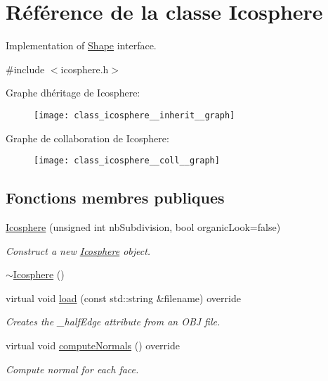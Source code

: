 \hypertarget{class_icosphere}{}\section{Référence de la classe Icosphere}
\label{class_icosphere}


Implementation of \hyperlink{class_shape}{Shape} interface.  




{\ttfamily \#include $<$icosphere.\+h$>$}



Graphe d\textquotesingle{}héritage de Icosphere\+:
\nopagebreak
\begin{figure}[H]
\begin{center}
\leavevmode
\texttt{[image: class\_icosphere\_\_inherit\_\_graph]}
\end{center}
\end{figure}


Graphe de collaboration de Icosphere\+:
\nopagebreak
\begin{figure}[H]
\begin{center}
\leavevmode
\texttt{[image: class\_icosphere\_\_coll\_\_graph]}
\end{center}
\end{figure}
\subsection*{Fonctions membres publiques}
\begin{DoxyCompactItemize}
\item 
\hyperlink{class_icosphere_a6051bb79f73f5aecb95074118fb019b3}{Icosphere} (unsigned int nb\+Subdivision, bool organic\+Look=false)
\begin{DoxyCompactList}\small\item\em Construct a new \hyperlink{class_icosphere}{Icosphere} object. \end{DoxyCompactList}\item 
\hyperlink{class_icosphere_ac9473c8c8d6085b6370d95772b898a45}{$\sim$\+Icosphere} ()
\item 
virtual void \hyperlink{class_icosphere_a72c3cc3d95cf508a623fe336cbbab350}{load} (const std\+::string \&filename) override
\begin{DoxyCompactList}\small\item\em Creates the \+\_\+half\+Edge attribute from an O\+BJ file. \end{DoxyCompactList}\item 
virtual void \hyperlink{class_icosphere_af7d6c8c60248794f6a6c382dc5f98a24}{compute\+Normals} () override
\begin{DoxyCompactList}\small\item\em Compute normal for each face. \end{DoxyCompactList}\end{DoxyCompactItemize}
